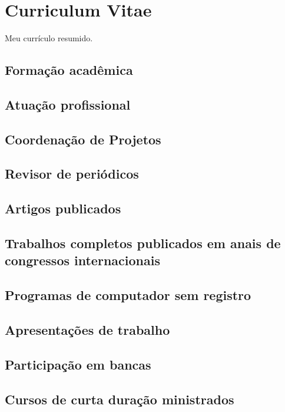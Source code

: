 \section{Curriculum Vitae}

Meu currículo resumido.


\subsection{Formação acadêmica}


\subsection{Atuação profissional}


\subsection{Coordenação de Projetos}


\subsection{Revisor de periódicos}


\subsection{Artigos publicados}


\subsection{Trabalhos completos publicados em anais de congressos internacionais}


\subsection{Programas de computador sem registro}


\subsection{Apresentações de trabalho}


\subsection{Participação em bancas}


\subsection{Cursos de curta duração ministrados}

